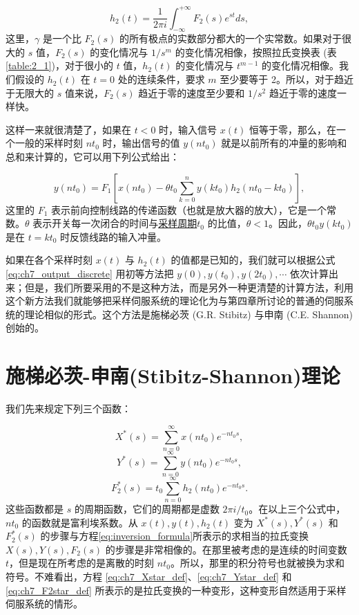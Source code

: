 \begin{equation}\label{eq:ch7_impulse_response}
h_2(t) = \frac{1}{2\pi i} \int_{-\infty}^{+\infty} F_2(s) e^{st} ds, 
\end{equation}
这里，$\gamma$ 是一个比 $F_2(s)$ 的所有极点的实数部分都大的一个实常数。如果对于很大的 $s$ 值，$F_2(s)$ 的变化情况与 $1/s^m$ 的变化情况相像，按照拉氏变换表 (表\ref{table:2_1})，对于很小的 $t$ 值，$h_2(t)$ 的变化情况与 $t^{m-1}$ 的变化情况相像。我们假设的 $h_2(t)$ 在 $t=0$ 处的连续条件，要求 $m$ 至少要等于 2。所以，对于趋近于无限大的 $s$ 值来说，$F_2(s)$ 趋近于零的速度至少要和 $1/s^2$ 趋近于零的速度一样快。

这样一来就很清楚了，如果在 $t < 0$ 时，输入信号 $x(t)$ 恒等于零，那么，在一个一般的采样时刻 $nt_0$ 时，输出信号的值 $y(nt_0)$ 就是以前所有的冲量的影响和总和来计算的，它可以用下列公式给出：

\begin{equation}\label{eq:ch7_output_discrete}
y(nt_0) = F_1 \left[ x(nt_0) - \theta t_0 \sum_{k=0}^n y(kt_0) h_2(nt_0 - kt_0) \right],
\end{equation}
这里的 $F_1$ 表示前向控制线路的传递函数（也就是放大器的放大），它是一个常数。$\theta$ 表示开关每一次闭合的时间与\underline{采样周期}$t_0$ 的比值，$\theta < 1$。因此，$\theta t_0 y(kt_0)$ 是在 $t = kt_0$ 时反馈线路的输入冲量。

如果在各个采样时刻 $x(t)$ 与 $h_2(t)$ 的值都是已知的，我们就可以根据公式 \eqref{eq:ch7_output_discrete} 用初等方法把 $y(0), y(t_0), y(2t_0), \cdots$ 依次计算出来；但是，我们所要采用的不是这种方法，而是另外一种更清楚的计算方法，利用这个新方法我们就能够把采样伺服系统的理论化为与第四章所讨论的普通的伺服系统的理论相似的形式。这个方法是施梯必茨 (G.R. Stibitz) 与申南 (C.E. Shannon) 创始的。


\section{施梯必茨-申南(Stibitz-Shannon)理论}  

我们先来规定下列三个函数：

\begin{equation}\label{eq:ch7_Xstar_def}
X^*(s) = \sum_{n=0}^{\infty} x(nt_0)e^{-nt_0 s},
\end{equation}
\begin{equation}\label{eq:ch7_Ystar_def}
Y^*(s) = \sum_{n=0}^{\infty} y(nt_0)e^{-nt_0 s},
\end{equation}
\begin{equation}\label{eq:ch7_F2star_def}
F_2^*(s) = t_0 \sum_{n=0}^{\infty} h_2(nt_0)e^{-nt_0 s}.
\end{equation}
这些函数都是 $s$ 的周期函数，它们的周期都是虚数 $2\pi i / t_0$。在以上三个公式中，$nt_0$ 的函数就是富利埃系数。从 $x(t), y(t), h_2(t)$ 变为 $X^*(s), Y^*(s)$ 和 $F_2^*(s)$ 的步骤与方程\eqref{eq:inversion_formula}所表示的求相当的拉氏变换 $X(s), Y(s), F_2(s)$ 的步骤是非常相像的。在那里被考虑的是连续的时间变数 $t$，但是现在所考虑的是离散的时刻 $nt_0$。所以，那里的积分符号也就被换为求和符号。不难看出，方程 \eqref{eq:ch7_Xstar_def}、\eqref{eq:ch7_Ystar_def} 和 \eqref{eq:ch7_F2star_def} 所表示的是拉氏变换的一种变形，这种变形自然适用于采样伺服系统的情形。

